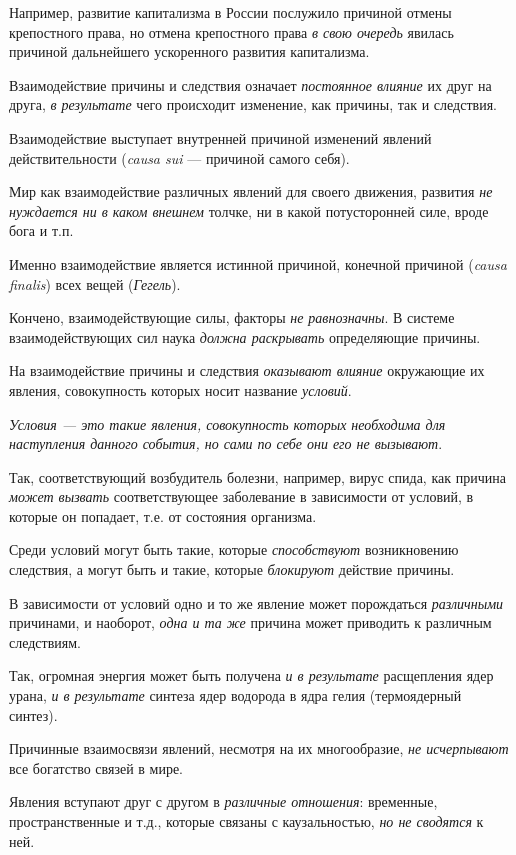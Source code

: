 \documentclass[a4paper,14pt,russian]{extreport}
\begin{document}
Например, развитие капитализма в России послужило причиной отмены крепостного права, но отмена крепостного права \emph{в свою очередь} явилась причиной дальнейшего ускоренного развития капитализма.

Взаимодействие причины и следствия означает \emph{постоянное влияние} их друг на друга, \emph{в результате} чего происходит изменение, как причины, так и следствия.

Взаимодействие выступает внутренней причиной изменений явлений действительности (\emph{causa sui} --- причиной самого себя).

Мир как взаимодействие различных явлений для своего движения, развития \emph{не нуждается ни в каком внешнем} толчке, ни в какой потусторонней силе, вроде бога и т.п.

Именно взаимодействие является истинной причиной, конечной причиной (\emph{causa finalis}) всех вещей (\emph{Гегель}).

Кончено, взаимодействующие силы, факторы \emph{не равнозначны}. В системе взаимодействующих сил наука \emph{должна раскрывать} определяющие причины.

На взаимодействие причины и следствия \emph{оказывают влияние} окружающие их явления, совокупность которых носит название \emph{условий}.

\emph{Условия --- это такие явления, совокупность которых необходима для наступления данного события, но сами по себе они его не вызывают}.

Так, соответствующий возбудитель болезни, например, вирус спида, как причина \emph{может вызвать} соответствующее заболевание в зависимости от условий, в которые он попадает, т.е. от состояния организма.

Среди условий могут быть такие, которые \emph{способствуют} возникновению следствия, а могут быть и такие, которые \emph{блокируют} действие причины.

В зависимости от условий одно и то же явление может порождаться \emph{различными} причинами, и наоборот, \emph{одна и та же} причина может приводить к различным следствиям.

Так, огромная энергия может быть получена \emph{и в результате} расщепления ядер урана, \emph{и в результате} синтеза ядер водорода в ядра гелия (термоядерный синтез).

Причинные взаимосвязи явлений, несмотря на их многообразие, \emph{не исчерпывают} все богатство связей в мире.

Явления вступают друг с другом в \emph{различные отношения}: временные, пространственные и т.д., которые связаны с каузальностью, \emph{но не сводятся} к ней.
\end{document}
